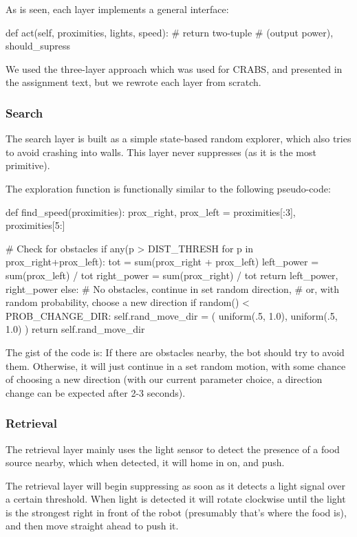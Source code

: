 \documentclass[a4paper,10pt]{article}
\begin{document}
As is seen, each layer implements a general interface: 
\begin{python}
def act(self, proximities, lights, speed):
    # return two-tuple 
    # (output power), should_supress
\end{python}

We used the three-layer approach which was used for CRABS, and presented in
the assignment text, but we rewrote each layer from scratch.

\subsubsection{Search}
The search layer is built as a simple state-based random explorer, which also
tries to avoid crashing into walls.  This layer never suppresses (as it is the
most primitive). 

The exploration function is functionally similar to the following pseudo-code:

\begin{python}
def find_speed(proximities):
    prox_right, prox_left = proximities[:3], proximities[5:]

    # Check for obstacles
    if any(p > DIST_THRESH for p in prox_right+prox_left):
        tot         = sum(prox_right + prox_left)
        left_power  = sum(prox_left)  / tot
        right_power = sum(prox_right) / tot
        return left_power, right_power
    else:
        # No obstacles, continue in set random direction,
        # or, with random probability, choose a new direction
        if random() < PROB_CHANGE_DIR:
            self.rand_move_dir = (
                uniform(.5, 1.0), 
                uniform(.5, 1.0)
            )
        return self.rand_move_dir
\end{python}

The gist of the code is: If there are obstacles nearby, the bot should try
to avoid them. Otherwise, it will just continue in a set random motion, with
some chance of choosing a new direction (with our current parameter choice, a
direction change can be expected after 2-3 seconds). 

\subsubsection{Retrieval}
The retrieval layer mainly uses the light sensor to detect the presence of a
food source nearby, which when detected, it will home in on, and push.

The retrieval layer will begin suppressing as soon as it detects a light
signal over a certain threshold. When light is detected it will rotate clockwise until 
the light is the strongest right in front of the robot (presumably that's where 
the food is), and then move straight ahead to push it.
\end{document}
